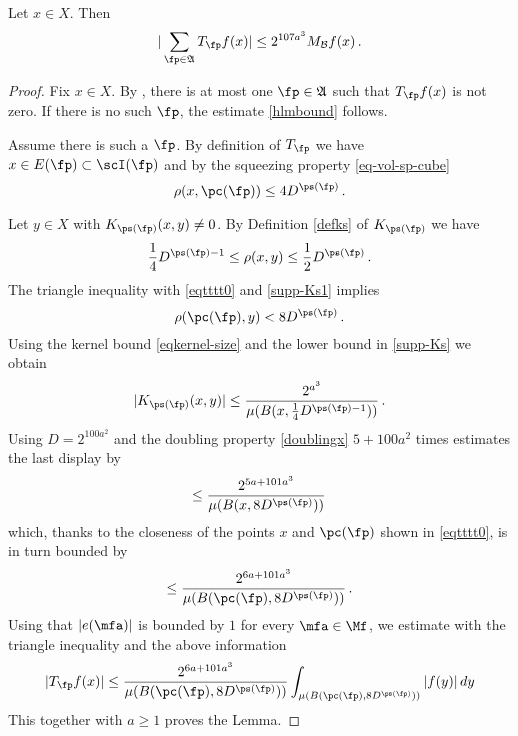 \begin{lemma}
    \label{maximal-bound-antichain}
    \leanok
    Let $x\in X$.
    Then
    \begin{equation}\label{hlmbound}
    | \sum_{\fp \in \mathfrak{A}}T_{\fp} f(x)|\le 2^{107 a^3} M_{\mathcal{B}} f (x) \, .
    \end{equation}
\end{lemma}

\begin{proof}
\leanok
Fix $x\in X$. By , there is at most one $\fp \in \mathfrak{A}$
such that
 $T_{\fp} f(x)$ is not zero.
 If there is no such $\fp$, the estimate \eqref{hlmbound} follows.

 Assume there is such a $\fp$.
 By definition of $T_{\fp}$ we have $x\in E(\fp)\subset \scI(\fp)$ and by the squeezing property \eqref{eq-vol-sp-cube}
\begin{equation}\label{eqtttt0}
    \rho(x, \pc(\fp))\le 4D^{\ps(\fp)}\, .
\end{equation}

Let $y\in X$ with $K_{\ps(\fp)}(x,y)\neq 0$. By Definition \eqref{defks} of $K_{\ps(\fp)}$
we have
\begin{equation}\label{supp-Ks1}
   \frac{1}{4} D^{\ps(\fp)-1}
   \leq \rho(x,y) \leq \frac{1}{2} D^{\ps(\fp)}\, .
\end{equation}
The triangle inequality with \eqref{eqtttt0} and \eqref{supp-Ks1} implies
\begin{equation}
    \rho(\pc(\fp),y) < 8D^{\ps(\fp)}\, .
\end{equation}
Using the kernel bound \eqref{eqkernel-size} and the lower bound in \eqref{supp-Ks}
we obtain
\begin{equation}
|K_{\ps(\fp)}(x,y)|\le \frac{2^{a^3}}{\mu(B(x,\frac 14 D^{{\ps(\fp)}-1}))}\, .
\end{equation}
Using $D=2^{100a^2}$
and the doubling property \eqref{doublingx} $5 +100a^2$ times estimates
the last display by
\begin{equation}
\le \frac{2^{5a+101a^3}}{\mu(B(x, 8D^{\ps(\fp)}))}\,
\end{equation}
which, thanks to the closeness of the points $x$ and $\pc(\fp)$ shown in \eqref{eqtttt0}, is in turn bounded by
\begin{equation}
\le \frac{2^{6a+101a^3}}{\mu(B(\pc(\fp), 8D^{\ps(\fp)}))}\, .
\end{equation}
 Using that {$|e(\mfa)|$} is bounded by $1$
for every $\mfa\in \Mf$, we estimate with the triangle inequality and the above information
 \begin{equation}
  | T_{\fp} f(x)|
    \le \frac{2^{6a+101 a^3}}{\mu(B(\pc(\fp), 8D^{\ps(\fp)}))} \int _{\mu(B(\pc(\fp), 8D^{\ps(\fp)}))} |f(y)|\, dy
  \end{equation}
This together with $a\ge 1$ proves the Lemma.
\end{proof}

